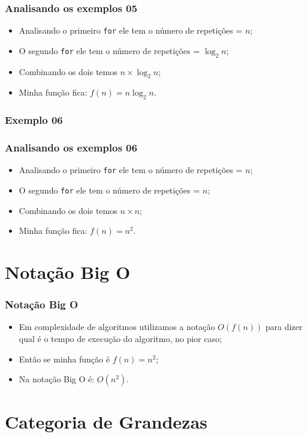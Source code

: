\documentclass{beamer}
\begin{document}
\begin{frame}
	\frametitle{Analisando os exemplos 05}
    \begin{itemize}[<+->]
        \item Analisando o primeiro \texttt{for} ele tem o número de repetições = $n$;
        \item O segundo \texttt{for} ele tem o número de repetições = $\log_2 n$;
        \item Combinando os dois temos $n \times \log_2 n$;
        \item Minha função fica: $f(n) = n\log_2 n$.
    \end{itemize}
\end{frame}

\begin{frame}
	\frametitle{Exemplo 06}
    
\end{frame}

\begin{frame}
	\frametitle{Analisando os exemplos 06}
    \begin{itemize}[<+->]
        \item Analisando o primeiro \texttt{for} ele tem o número de repetições = $n$;
        \item O segundo \texttt{for} ele tem o número de repetições = $n$;
        \item Combinando os dois temos $n \times n$;
        \item Minha função fica: $f(n) = n^2$.
    \end{itemize}
\end{frame}

\section{Notação Big O}

\begin{frame}
	\frametitle{Notação Big O}
    \begin{itemize}
        \item Em complexidade de algoritmos utilizamos a notação $O(f(n))$ para dizer qual é o tempo de execução do algoritmo, no pior caso;
        \item Então se minha função é $f(n) = n^2$;
        \item Na notação Big O é: $O(n^2)$.
    \end{itemize}
\end{frame}

\section{Categoria de Grandezas}
\end{document}
